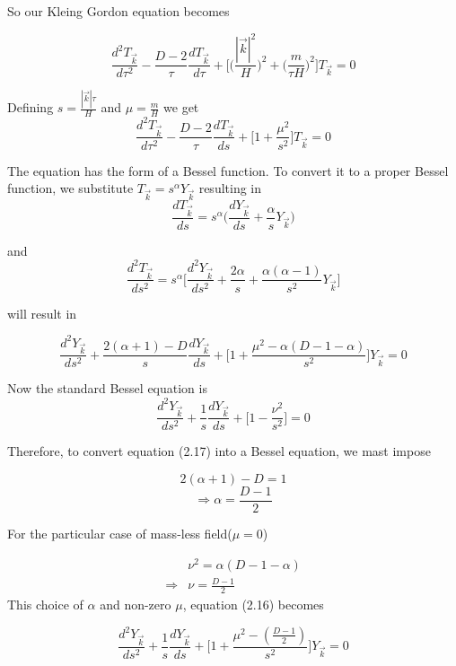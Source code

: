 So our Kleing Gordon equation becomes 

\begin{equation}
\frac{d^2T_{\vec{k}}}{d\tau^2} - \frac{D-2}{\tau}\frac{dT_{\vec{k}}}{d\tau} + \Bigg[\bigg(\frac{|\vec{k}|^2}{H}\bigg)^2 + \bigg(\frac{m}{\tau H}\bigg)^2 \Bigg]T_{\vec{k}}=0
\end{equation}

Defining $s=\frac{|\vec{k}|\tau}{H}$ and $\mu = \frac{m}{H}$ we get
\begin{equation}
\frac{d^2T_{\vec{k}}}{d\tau^2} - \frac{D-2}{\tau}\frac{dT_{\vec{k}}}{ds} + \bigg[1 + \frac{\mu^2}{s^2}\bigg]T_{\vec{k}}=0 
\end{equation}

The equation has the form of a Bessel function. To convert it to a proper Bessel function, we substitute $T_{\vec{k}}= s^\alpha Y_{\vec{k}}$ resulting in
$$
\frac{dT_{\vec{k}}}{ds} = s^\alpha \bigg(\frac{dY_{\vec{k}}}{ds} + \frac{\alpha}{s}Y_{\vec{k}}\bigg)
$$

and
$$
\frac{d^2T_{\vec{k}}}{ds^2} = s^{\alpha} \Bigg[\frac{d^2Y_{\vec{k}}}{ds^2}+\frac{2\alpha}{s}+\frac{\alpha(\alpha - 1)}{s^2}Y_{\vec{k}}\Bigg]
$$

will result in

\begin{equation}
\frac{d^2Y_{\vec{k}}}{ds^2}+\frac{2(\alpha+1)-D}{s}\frac{dY_{\vec{k}}}{ds}+ \bigg[ 1 + \frac{\mu^2-\alpha (D-1-\alpha)}{s^2}\bigg] Y_{\vec{k}}=0
\end{equation}

Now the standard Bessel equation \autocite{arfken2013mathematical} is
\begin{equation}
\frac{d^2Y_{\vec{k}}}{ds^2}+ \frac{1}{s}\frac{dY_{\vec{k}}}{ds}+ \bigg[ 1 - \frac{\nu^2}{s^2}\bigg]=0
\end{equation}

Therefore, to convert equation (2.17) into a Bessel equation, we mast impose



$$2(\alpha+1)-D=1$$
$$\Rightarrow \alpha=\frac{D-1}{2}$$

For the particular case of mass-less field($\mu=0$)

\begin{align}
& \nu^2 = \alpha(D-1-\alpha) \\
\Rightarrow & \nu = \frac{D-1}{2}
\end{align}
This choice of $\alpha$ and non-zero $\mu$, equation (2.16) becomes 

\begin{equation}
\frac{d^2Y_{\vec{k}}}{ds^2}+ \frac{1}{s}\frac{dY_{\vec{k}}}{ds}+ \Bigg[ 1 + \frac{\mu^2 - (\frac{D-1}{2})}{s^2}\Bigg] Y_{\vec{k}}= 0
\end{equation}

